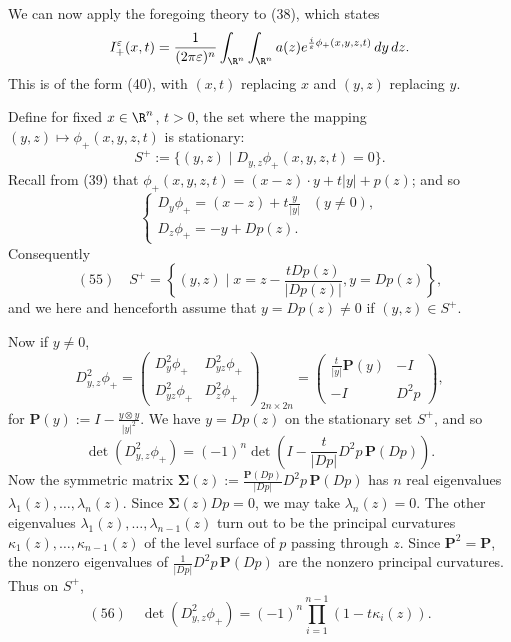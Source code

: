 \begin{example}
\label{ex:stationary-phase-wave-equation-continued}
We can now apply the foregoing theory to (38), which states
$$I_+^\varepsilon(x,t) = \frac{1}{(2\pi\varepsilon)^n}\int_{\R^n}\int_{\R^n} a(z)e^{\frac{i}{\varepsilon}\phi_+(x,y,z,t)}\,dy\,dz.$$
This is of the form (40), with $(x,t)$ replacing $x$ and $(y,z)$ replacing $y$.

Define for fixed $x\in\R^n$, $t>0$, the set where the mapping $(y,z)\mapsto \phi_+(x,y,z,t)$ is stationary:
$$S^+ := \{(y,z) \mid D_{y,z}\phi_+(x,y,z,t)=0\}.$$
Recall from (39) that $\phi_+(x,y,z,t) = (x-z)\cdot y+t|y|+p(z)$; and so
$$\begin{cases} D_y\phi_+ = (x-z)+t\frac{y}{|y|} & (y\neq 0), \\ D_z\phi_+ = -y+Dp(z). \end{cases}$$
Consequently
$$(55) \quad S^+ = \left\{(y,z) \mid x = z - \frac{tDp(z)}{|Dp(z)|}, y=Dp(z)\right\},$$
and we here and henceforth assume that $y=Dp(z)\neq 0$ if $(y,z)\in S^+$.

Now if $y\neq 0$,
$$D^2_{y,z}\phi_+ = \begin{pmatrix} D_y^2\phi_+ & D_{yz}^2\phi_+ \\ D_{yz}^2\phi_+ & D_z^2\phi_+ \end{pmatrix}_{2n\times 2n} = \begin{pmatrix} \frac{t}{|y|}\mathbf{P}(y) & -I \\ -I & D^2p \end{pmatrix},$$
for $\mathbf{P}(y) := I - \frac{y\otimes y}{|y|^2}$. We have $y=Dp(z)$ on the stationary set $S^+$, and so
$$\det(D^2_{y,z}\phi_+) = (-1)^n \det\left(I - \frac{t}{|Dp|}D^2p\,\mathbf{P}(Dp)\right).$$
Now the symmetric matrix $\boldsymbol\Sigma(z):=\frac{\mathbf{P}(Dp)}{|Dp|}D^2p\,\mathbf{P}(Dp)$ has $n$ real eigenvalues $\lambda_1(z),\ldots,\lambda_n(z)$. Since $\boldsymbol\Sigma(z)Dp=0$, we may take $\lambda_n(z)=0$. The other eigenvalues $\lambda_1(z),\ldots,\lambda_{n-1}(z)$ turn out to be the principal curvatures $\kappa_1(z),\ldots,\kappa_{n-1}(z)$ of the level surface of $p$ passing through $z$. Since $\mathbf{P}^2=\mathbf{P}$, the nonzero eigenvalues of $\frac{1}{|Dp|}D^2p\,\mathbf{P}(Dp)$ are the nonzero principal curvatures. Thus on $S^+$,
$$(56) \quad \det(D^2_{y,z}\phi_+) = (-1)^n \prod_{i=1}^{n-1}(1-t\kappa_i(z)).$$


\end{example}

